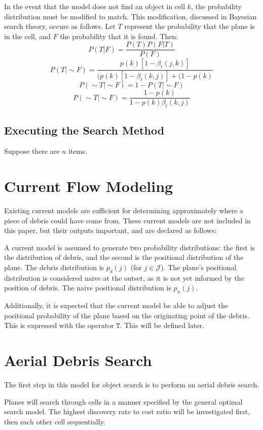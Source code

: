 \documentclass[a4paper,twocolumns]{article}
\begin{document}
\begin{multicols}{2}
In the event that the model does not find an object in cell $k$, the probability distribution must be modified to match. This modification, discussed in Bayesian search theory, occurs as follows. Let $T$ represent the probability that the plane is in the cell, and $F$ the probability that it is found. Then: 
$$P(T|F)=\frac{P(T)P(F|T)}{P(F)}$$ 
$$P(T|\sim F)=\frac{p(k)[1-\beta_t(j,k)]}{(p(k)[1-\beta_t(k,j)]+(1-p(k)}$$
$$P(\sim T|\sim F)=1-P(T|\sim F)$$
$$P(\sim T|\sim F)=\frac{1-p(k)}{1-p(k)\beta_t(k,j)}$$


\subsection{Executing the Search Method}

Suppose there are $n$ items. 

\section{Current Flow Modeling}

Existing current models are sufficient for determining approximately where a piece of debris could have come from. These current models are not included in this paper, but their outputs important, and are declared as follows:

A current model is assumed to generate two probability distributions: the first is the distribution of debris, and the second is the positional distribution of the plane. The debris distribution is $p_d(j)$ (for $j\in\mathcal{J}$). The plane's positional distribution is considered naive at the outset, as it is not yet informed by the position of debris. The naive positional distribution is $p_n(j)$. 

Additionally, it is expected that the current model be able to adjust the positional probability of the plane based on the originating point of the debris. This is expressed with the operator $\mathtt{T}$. This will be defined later. 

\section{Aerial Debris Search}

The first step in this model for object search is to perform an aerial debris search. 

Planes will search through cells in a manner specified by the general optimal search model. The highest discovery rate to cost ratio will be investigated first, then each other cell sequentially.


\end{multicols}
\end{document}
